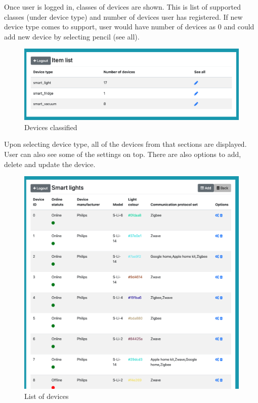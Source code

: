 Once user is logged in, classes of devices are shown. This is list of supported classes (under device type) and number of devices user has registered. If new device type comes to support, user would have number of devices as 0 and could add new device by selecting pencil (see all).
\begin{figure}[H]
\includegraphics[scale=0.4]{img/deviceClasses.jpeg}
\centering
\caption{Devices classified}
\end{figure}

Upon selecting device type, all of the devices from that sections are displayed. User can also see some of the settings on top. There are also options to add, delete and update the device.
\begin{figure}[H]
\includegraphics[scale=0.4]{img/listOfDevices.jpeg}
\centering
\caption{List of devices}
\end{figure}

